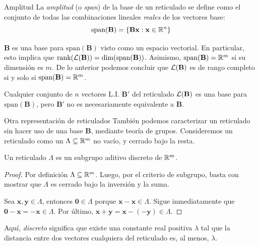 \begin{frame}{Amplitud}
La {\it amplitud} (o {\it span}) de la base de un reticulado se define como el conjunto de todas las combinaciones lineales {\it reales} de los vectores base:
\[
\text{span}(\mathbf B) = \left\{\mathbf{Bx} : \mathbf x \in \mathbb{R}^n \right\}
\]

$\mathbf B$ es una base para $\text{span}(\mathbf{B})$ visto como un espacio vectorial. En particular, esto implica que $\text{rank}(\mathcal{L}(\mathbf{B})) = \text{dim}(\text{span}(\mathbf B))$. Asimismo, $\text{span}(\mathbf B) = \mathbb{R}^m$ si su dimensión es $m$. De lo anterior podemos concluir que $\mathcal{L}(\mathbf{B})$ es de rango completo si y solo si $\text{span}(\mathbf B) = \mathbb{R}^m$.

\begin{remark}
Cualquier conjunto de $n$ vectores L.I. $\mathbf B'$ del reticulado $\mathcal{L}(\mathbf{B})$ es una base para $\text{span}(\mathbf B)$, pero $\mathbf B'$ no es necesariamente equivalente a $\mathbf B$.
\end{remark}
\end{frame}

\begin{frame}{Otra representación de reticulados}
También podemos caracterizar un reticulado sin hacer uso de una base $\mathbf B$, mediante teoría de grupos. Consideremos un reticulado como un $\Lambda \subseteq \mathbb{R}^m$ no vacío, y cerrado bajo la resta.

\begin{proposition}
    Un reticulado $\Lambda$ es un subgrupo aditivo discreto de $\mathbb{R}^m$.
\end{proposition}
\begin{proof}
    Por definición $\Lambda \subseteq \mathbb{R}^m$. Luego, por el criterio de subgrupo, basta con mostrar que $\Lambda$ es cerrado bajo la inversión y la suma.

    Sea $\mathbf x, \mathbf y \in \Lambda$, entonces $\mathbf 0 \in \Lambda$ porque $\mathbf x - \mathbf x \in \Lambda$. Sigue inmediatamente que $\mathbf{0 - x} = \mathbf {-x} \in \Lambda$. Por último, $\mathbf{x+y} = \mathbf x - (-\mathbf y) \in \Lambda$.
\end{proof}

Aquí, {\it discreto} significa que existe una constante real positiva $\lambda$ tal que la distancia entre dos vectores cualquiera del reticulado es, al menos, $\lambda$.
\end{frame}

